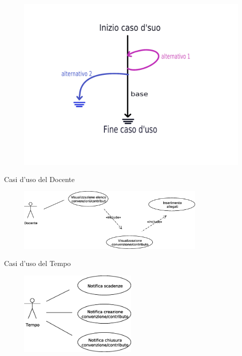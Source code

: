   \begin{frame}{}
     \begin{figure}[h]
      \centering
      \includegraphics[scale=0.25]{images/flows.png}
    \end{figure}
   
  \end{frame}


  
  \begin{frame}{Casi d'uso del Docente}
    \begin{figure}[h]
      \label{use_case_diag_teacher}
      \centering
      \includegraphics[width=0.8\textwidth]{images/casi_uso_docente.eps}
    \end{figure}
  \end{frame}
  
  \begin{frame}{Casi d'uso del Tempo}
    \begin{figure}[h]
      \label{use_case_diag_time}
      \centering
      \includegraphics[width = 0.5\textwidth]{images/casi_uso_tempo.eps}
    \end{figure}
  \end{frame}


